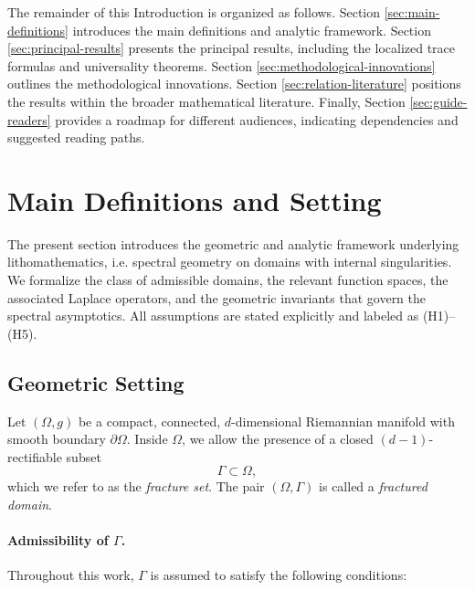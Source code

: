 The remainder of this Introduction is organized as follows. Section
\ref{sec:main-definitions} introduces the main definitions and analytic
framework. Section \ref{sec:principal-results} presents the principal
results, including the localized trace formulas and universality
theorems. Section \ref{sec:methodological-innovations} outlines the
methodological innovations. Section \ref{sec:relation-literature}
positions the results within the broader mathematical literature. Finally,
Section \ref{sec:guide-readers} provides a roadmap for different
audiences, indicating dependencies and suggested reading paths.


\section{Main Definitions and Setting}

The present section introduces the geometric and analytic framework underlying
lithomathematics, i.e. spectral geometry on domains with internal singularities.
We formalize the class of admissible domains, the relevant function spaces, the
associated Laplace operators, and the geometric invariants that govern the
spectral asymptotics. All assumptions are stated explicitly and labeled as
(H1)--(H5).

\subsection{Geometric Setting}

Let $(\Omega,g)$ be a compact, connected, $d$-dimensional Riemannian manifold
with smooth boundary $\partial\Omega$. Inside $\Omega$, we allow the presence
of a closed $(d-1)$-rectifiable subset
\[
\Gamma \subset \Omega,
\]
which we refer to as the \emph{fracture set}.
The pair $(\Omega,\Gamma)$ is called a \emph{fractured domain}.

\paragraph{Admissibility of $\Gamma$.}
Throughout this work, $\Gamma$ is assumed to satisfy the following conditions:


